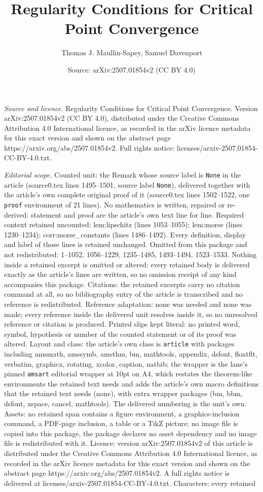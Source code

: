 \documentclass[10pt,a4paper]{amsart}
\title[Regularity Conditions for Critical Point Convergence]{Regularity Conditions for Critical Point Convergence}
\author{Thomas J. Maullin-Sapey, Samuel Davenport}
\date{Source: arXiv:2507.01854v2 (CC BY 4.0)}
\begin{document}
\maketitle

\noindent\emph{Source and licence.} Regularity Conditions for Critical Point Convergence. Version arXiv:2507.01854v2 (CC BY 4.0), distributed under the Creative Commons Attribution 4.0 International licence, as recorded in the arXiv licence metadata for this exact version and shown on the abstract page https://arxiv.org/abs/2507.01854v2. Full rights notice: licenses/arxiv-2507.01854-CC-BY-4.0.txt.\par\smallskip

\noindent\textit{Editorial scope.} Counted unit: the Remark whose source label is \texttt{None} in the article (source0.tex lines 1495--1501, source label \texttt{None}), delivered together with the article's own complete original proof of it (source0.tex lines 1502--1522, one \texttt{proof} environment of 21 lines). No mathematics is written, repaired or re-derived: statement and proof are the article's own text line for line. Required context retained uncounted: lem:lipschitz (lines 1053--1055); lem:morse (lines 1230--1234); corr:morse\_constants (lines 1486--1492). Every definition, display and label of those lines is retained unchanged. Omitted from this package and not redistributed: 1--1052, 1056--1229, 1235--1485, 1493--1494, 1523--1533. Nothing inside a retained excerpt is omitted or altered: every retained body is delivered exactly as the article's lines are written, so no omission receipt of any kind accompanies this package. Citations: the retained excerpts carry no citation command at all, so no bibliography entry of the article is transcribed and no reference is redistributed. Reference adaptation: none was needed and none was made; every reference inside the delivered unit resolves inside it, so no unresolved reference or citation is produced. Printed slips kept literal: no printed word, symbol, hypothesis or number of the counted statement or of its proof was altered. Layout and class: the article's own class is \texttt{article} with packages including amsmath, amssymb, amsthm, bm, mathtools, appendix, dsfont, floatflt, verbatim, graphicx, rotating, xcolor, caption, natbib; the wrapper is the lane's pinned \texttt{amsart} editorial wrapper at 10pt on A4, which restates the theorem-like environments the retained text needs and adds the article's own macro definitions that the retained text needs (none), with extra wrapper packages (bm, bbm, dsfont, xspace, cancel, mathtools). The delivered numbering is the unit's own. Assets: no retained span contains a figure environment, a graphics-inclusion command, a PDF-page inclusion, a table or a TikZ picture; no image file is copied into this package, the package declares no asset dependency and no image file is redistributed with it. Licence: version arXiv:2507.01854v2 of this article is distributed under the Creative Commons Attribution 4.0 International licence, as recorded in the arXiv licence metadata for this exact version and shown on the abstract page https://arxiv.org/abs/2507.01854v2. A full rights notice is delivered at licenses/arxiv-2507.01854-CC-BY-4.0.txt. Characters: every retained 
\end{document}
